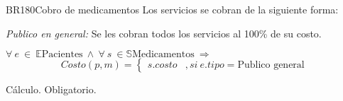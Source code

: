 \begin{BussinesRule}{BR180}{Cobro de medicamentos}
	\BRitem[Descripción:] Los servicios se cobran de la siguiente forma:
		\begin{Citemize}
			\item {\em Publico en general:} Se les cobran todos los servicios al 100\% de su costo.
		\end{Citemize}
	\BRitem[Sentencia:] $\forall~e~\in~\mathbb{E}\textrm{Pacientes}~\land~\forall~s~\in \mathbb{S}\textrm{Medicamentos}~\Rightarrow$
		\begin{displaymath}
			Costo(p,m) = \left\{ \begin{array}{ll}
			s.costo & , si~e.tipo = \textrm{Publico general}
			\end{array} \right.
		\end{displaymath}

	\BRitem[Tipo:] Cálculo.
	\BRitem[Nivel:] Obligatorio.
\end{BussinesRule}




